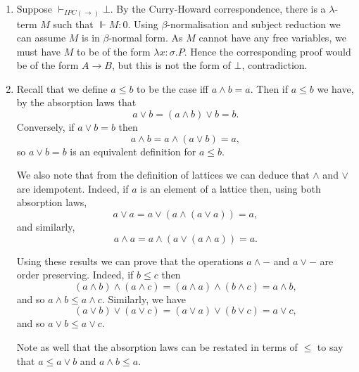 \documentclass{article}
\theoremstyle{plain}
\begin{document}
\begin{enumerate}
\begin{enumerate}
\[\begin{tikzcd}[cramped]
				&&& X
				\arrow[from=3-2, to=1-4]
				\arrow[from=3-4, to=3-2]
				\arrow[from=3-4, to=3-6]
				\arrow[from=3-6, to=1-4]
				\arrow[from=4-1, to=3-2]
				\arrow[from=4-3, to=3-4]
				\arrow[from=4-5, to=3-4]
				\arrow[from=4-7, to=3-6]
				\arrow[from=5-2, to=4-1]
				\arrow[from=5-2, to=4-3]
				\arrow[from=5-4, to=4-3]
				\arrow[from=5-4, to=4-5]
				\arrow[from=5-6, to=4-5]
				\arrow[from=5-6, to=4-7]
				\arrow[from=6-3, to=5-2]
				\arrow[from=6-3, to=5-4]
				\arrow[from=6-5, to=5-4]
				\arrow[from=6-5, to=5-6]
				\arrow[from=7-4, to=6-3]
				\arrow[from=7-4, to=6-5]
			\end{tikzcd}\]
			\item \textcolor{red}{Rather unenlightening checking}
		\end{enumerate}
		\item Suppose $\vdash_{IPC(\rightarrow)} \bot$. By the Curry-Howard correspondence, there is a $\lambda$-term $M$ such that $\Vdash M \colon 0$. Using $\beta$-normalisation and subject reduction we can assume $M$ is in $\beta$-normal form. As $M$ cannot have any free variables, we must have $M$ to be of the form $\lambda x\colon \sigma. P$. Hence the corresponding proof would be of the form $A \rightarrow B$, but this is not the form of $\bot$, contradiction.
		\item Recall that we define $a\leq b$ to be the case iff $a\wedge b = a$. Then if $a\leq b$ we have, by the absorption laws that
		\[
			a \vee b = (a \wedge b) \vee b = b.
		\]
		Conversely, if $a\vee b = b$ then 
		\[
			a \wedge b = a \wedge (a \vee b) = a,
		\]
		so $a \vee b = b$ is an equivalent definition for $a\leq b$.
		
		We also note that from the definition of lattices we can deduce that $\wedge$ and $\vee$ are idempotent. Indeed, if $a$ is an element of a lattice then, using both absorption laws,
		\[
			a \vee a = a\vee (a \wedge (a \vee a)) = a,
		\]
		and similarly,
		\[
			a \wedge a = a \wedge (a \vee (a\wedge a)) = a.
		\]
		
		Using these results we can prove that the operations $a \wedge -$ and $a \vee -$ are order preserving. Indeed, if $b\leq c$ then
		\[
			(a \wedge b) \wedge (a \wedge c) = (a \wedge a) \wedge (b \wedge c) = a \wedge b,
		\]
		and so $a \wedge b \leq a \wedge c$. Similarly, we have
		\[
			(a \vee b) \vee (a \vee c) = (a \vee a) \vee (b \vee c) = a \vee c,
		\]
		and so $a \vee b \leq a \vee c$.
		
		Note as well that the absorption laws can be restated in terms of $\leq$ to say that $a \leq a\vee b$ and $a \wedge b \leq a$.
		

\end{enumerate}
\end{document}
